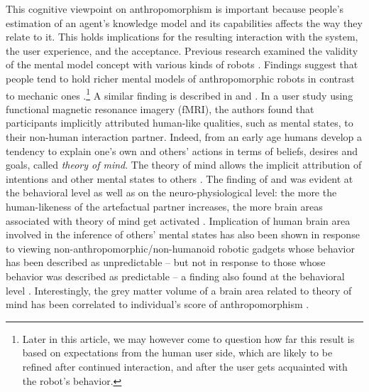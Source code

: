 \documentclass{frontiersSCNS} %
\begin{document}
This cognitive viewpoint on anthropomorphism is important because people's
estimation of an agent's knowledge model and its capabilities affects the way
they relate to it. This holds implications for the resulting interaction with
the system, the user experience, and the acceptance. Previous research examined
the validity of the mental model concept with various kinds of robots
\citep{schmitz_concepts_2011,kiesler_mental_2002}. Findings suggest that people
tend to hold richer mental models of anthropomorphic robots in contrast to
mechanic ones \citep{kiesler_mental_2002}.\footnote{Later in this article,
we may however come to question how far this result is based on
expectations from the human user side, which are likely to be refined
after continued interaction, and after the user gets acquainted with the
robot's behavior.} A similar finding is described in
\cite{hegel_understanding_2008} and \cite{krach_can_2008}. In a user study using
functional magnetic resonance imagery (fMRI), the authors found that
participants implicitly attributed human-like qualities, such as mental states,
to their non-human interaction partner. Indeed, from an early age humans develop
a tendency to explain one's own and others' actions in terms of beliefs, desires
and goals,  called \textit{theory of mind}. The theory of mind allows the
implicit attribution of intentions and other mental states to others
\citep{premack1978does,leslie_pretense_1987,Frith2003}.  The finding of
\cite{hegel_understanding_2008} and \cite{krach_can_2008} was evident at the
behavioral level as well as on the neuro-physiological level: the more the
human-likeness of the artefactual partner increases, the more brain areas
associated with theory of mind  get activated \citep{krach_can_2008}.
Implication of human brain area involved in the inference of others' mental
states has also been shown in response to viewing
non-anthropomorphic/non-humanoid robotic gadgets whose behavior has been
described as unpredictable -- but not in response to those whose behavior was
described as predictable -- a finding also found at the behavioral level
\citep{Waytz2010}.  Interestingly, the grey matter volume of a brain area
related to theory of mind has been correlated to individual's score of
anthropomorphism \citep{cullen2013individual}.
\end{document}
